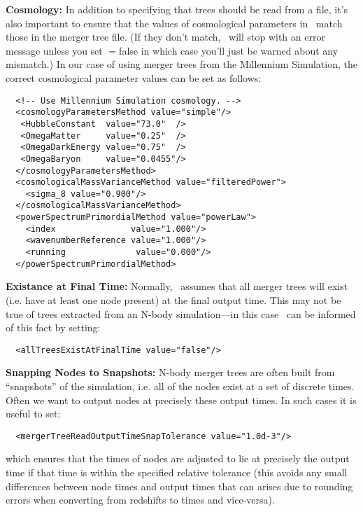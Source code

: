 {\normalfont \bfseries Cosmology:} In addition to specifying that trees should be read from a file, it's also important to ensure that the values of cosmological parameters in \glc\ match those in the merger tree file. (If they don't match, \glc\ will stop with an error message unless you set {\normalfont \ttfamily [mergerTreeReadMismatchIsFatal]}$=${\normalfont \ttfamily false} in which case you'll just be warned about any mismatch.) In our case of using merger trees from the Millennium Simulation, the correct cosmological parameter values can be set as follows:
\begin{verbatim}
  <!-- Use Millennium Simulation cosmology. -->
  <cosmologyParametersMethod value="simple"/>
   <HubbleConstant  value="73.0"  />
   <OmegaMatter     value="0.25"  />
   <OmegaDarkEnergy value="0.75"  />
   <OmegaBaryon     value="0.0455"/>
  </cosmologyParametersMethod>
  <cosmologicalMassVarianceMethod value="filteredPower">
    <sigma_8 value="0.900"/>
  </cosmologicalMassVarianceMethod>
  <powerSpectrumPrimordialMethod value="powerLaw">
    <index               value="1.000"/>
    <wavenumberReference value="1.000"/>
    <running              value="0.000"/>
  </powerSpectrumPrimordialMethod>
\end{verbatim}

{\normalfont \bfseries Existance at Final Time:} Normally, \glc\ assumes that all merger trees will exist (i.e. have at least one node present) at the final output time. This may not be true of trees extracted from an N-body simulation---in this case \glc\ can be informed of this fact by setting:
\begin{verbatim}
  <allTreesExistAtFinalTime value="false"/>
\end{verbatim}

{\normalfont \bfseries Snapping Nodes to Snapshots:} N-body merger trees are often built from ``snapshots'' of the simulation, i.e. all of the nodes exist at a set of discrete times. Often we want to output nodes at precisely these output times. In such cases it is useful to set:
\begin{verbatim}
  <mergerTreeReadOutputTimeSnapTolerance value="1.0d-3"/>
\end{verbatim}
which ensures that the times of nodes are adjusted to lie at precisely the output time if that time is within the specified relative tolerance (this avoids any small differences between node times and output times that can arises due to rounding errors when converting from redshifts to times and vice-versa).


